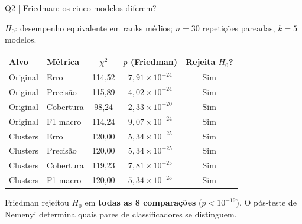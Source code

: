 \documentclass[aspectratio=169,11pt]{beamer}
\begin{document}
\begin{frame}[t]{Q2 | Friedman: os cinco modelos diferem?}

\small $H_0$: desempenho equivalente em ranks médios; $n=30$ repetições pareadas, $k=5$ modelos.\vspace{2mm}
\par
\scriptsize
\renewcommand{\arraystretch}{1.1}
\setlength{\tabcolsep}{4pt}
\centering
\begin{tabular}{llccc}
\toprule
Alvo & Métrica & $\chi^2$ & $p$ (Friedman) & Rejeita $H_0$? \\
\midrule
Original & Erro & 114,52 & $7,91\times 10^{-24}$ & Sim \\
Original & Precisão & 115,89 & $4,02\times 10^{-24}$ & Sim \\
Original & Cobertura & 98,24 & $2,33\times 10^{-20}$ & Sim \\
Original & F1 macro & 114,24 & $9,07\times 10^{-24}$ & Sim \\
Clusters & Erro & 120,00 & $5,34\times 10^{-25}$ & Sim \\
Clusters & Precisão & 120,00 & $5,34\times 10^{-25}$ & Sim \\
Clusters & Cobertura & 119,23 & $7,81\times 10^{-25}$ & Sim \\
Clusters & F1 macro & 120,00 & $5,34\times 10^{-25}$ & Sim \\
\bottomrule
\end{tabular}
\par
\vspace{2mm}\begin{notabox}\scriptsize Friedman rejeitou $H_0$ em \textbf{todas as 8 comparações} ($p < 10^{-19}$). O pós-teste de Nemenyi determina quais pares de classificadores se distinguem.\end{notabox}

\end{frame}
\end{document}
